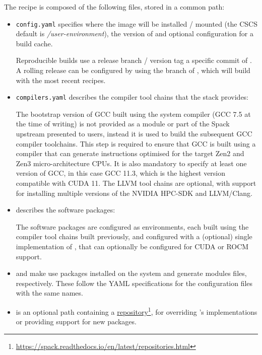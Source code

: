 The \stackinator recipe is composed of the following files, stored in a common path:
\begin{itemize}
    \item  \lstinline{config.yaml} specifies where the image will be installed / mounted (the CSCS default is \emph{/user-environment}), the version of \spack and optional configuration for a \spack build cache. 
        
        Reproducible builds use a release branch / version tag a specific commit of \spack. A rolling release can be configured by using the  branch of \spack, which will build with the most recent \spack recipes.

    \item \lstinline{compilers.yaml} describes the compiler tool chains that the stack provides:
        
        The bootstrap version of GCC built using the system compiler (GCC 7.5 at the time of writing) is not provided as a module or part of the Spack upstream presented to users, instead it is used to build the subsequent GCC compiler toolchains.
        This step is required to ensure that GCC is built using a compiler that can generate instructions optimised for the target Zen2 and Zen3 micro-architecture CPUs.
        It is also mandatory to specify at least one version of GCC, in this case GCC 11.3, which is the highest version compatible with CUDA 11.
        The LLVM tool chains are optional, with support for installing multiple versions of the NVIDIA HPC-SDK and LLVM/Clang.

    \item {} describes the software packages:
        
        The software packages are configured as environments, each built using the compiler tool chains built previously, and configured with a (optional) single implementation of \craympich, that can optionally be configured for CUDA or ROCM support.

    \item {} and  make \spack use packages installed on the system and generate modules files, respectively.
        These follow the YAML specifications for the \spack configuration files with the same names.

    \item {} is an optional path containing a \href{https://spack.readthedocs.io/en/latest/repositories.html}{\spack repository}\footnote{\url{https://spack.readthedocs.io/en/latest/repositories.html}}, for overriding \spack's implementations or providing support for new packages.

\end{itemize}

